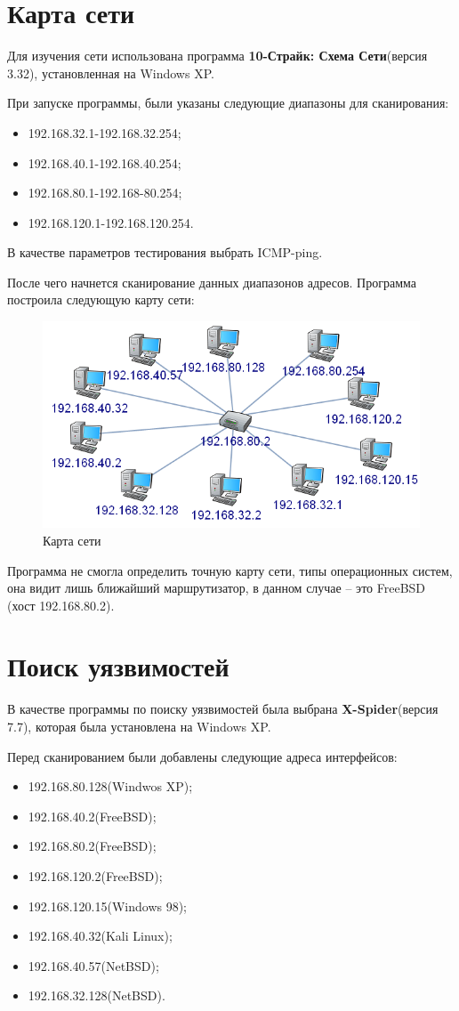 \documentclass[a4paper, 12pt]{article}		%
\begin{document}
\section{Карта сети}
Для изучения сети использована программа \textbf{10-Страйк: Схема Сети}(версия 3.32), установленная на Windows XP.

При запуске программы, были указаны следующие диапазоны для сканирования:
\begin{itemize}
\item 192.168.32.1-192.168.32.254;
\item 192.168.40.1-192.168.40.254;
\item 192.168.80.1-192.168-80.254;
\item 192.168.120.1-192.168.120.254.
\end{itemize}
В качестве параметров тестирования выбрать ICMP-ping. 

После чего начнется сканирование данных диапазонов адресов. Программа построила следующую карту сети:
\begin{figure}[H]
  \centering
  \includegraphics[width=.7\textwidth]{img/3}
  \caption{Карта сети}
\end{figure}
Программа не смогла определить точную карту сети, типы операционных систем, она видит лишь ближайший маршрутизатор, в данном случае – это FreeBSD (хост 192.168.80.2).
\section{Поиск уязвимостей}
В качестве программы по поиску уязвимостей была выбрана \textbf{X-Spider}(версия 7.7), которая была установлена на Windows XP.

Перед сканированием были добавлены следующие адреса интерфейсов:
\begin{multicols}{2}
\begin{itemize}
\item 192.168.80.128(Windwos XP);
\item 192.168.40.2(FreeBSD);
\item 192.168.80.2(FreeBSD);
\item 192.168.120.2(FreeBSD);
\item 192.168.120.15(Windows 98);
\item 192.168.40.32(Kali Linux);
\item 192.168.40.57(NetBSD);
\item 192.168.32.128(NetBSD).
\end{itemize}
\end{multicols}
\end{document}
